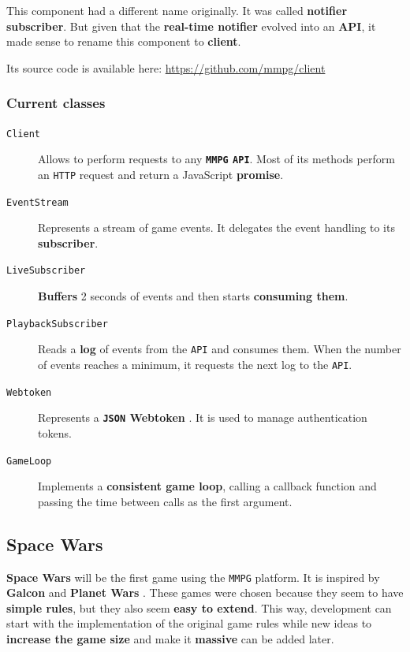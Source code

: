 \documentclass[a4paper,11pt]{article}
\begin{document}
This component had a different name originally. It was called \textbf{notifier subscriber}. But given that the \textbf{real-time
notifier} evolved into an \textbf{API}, it made sense to rename this component to \textbf{client}.

Its source code is available here: \url{https://github.com/mmpg/client}
\subsubsection{Current classes}
\begin{description}
\item[\texttt{Client}]
Allows to perform requests to any \textbf{\texttt{MMPG} \texttt{API}}. Most of its methods perform an \texttt{HTTP} request
  and return a JavaScript \textbf{promise}.
\item[\texttt{EventStream}]
Represents a stream of game events. It delegates the event handling to its \textbf{subscriber}.
\item[\texttt{LiveSubscriber}]
\textbf{Buffers} 2 seconds of events and then starts \textbf{consuming them}.
\item[\texttt{PlaybackSubscriber}]
Reads a \textbf{log} of events from the \texttt{API} and consumes them. When the number of
  events reaches a minimum, it requests the next log to the \texttt{API}.
\item[\texttt{Webtoken}]
Represents a \textbf{\texttt{JSON} Webtoken} \cite{jwt}. It is used to manage authentication tokens.
\item[\texttt{GameLoop}]
Implements a \textbf{consistent game loop}, calling a callback function and passing the time
  between calls as the first argument.
\end{description}
\subsection{Space Wars}
\textbf{Space Wars} will be the first game using the \texttt{MMPG} platform. It is inspired by \textbf{Galcon} \cite{galcon}
and \textbf{Planet Wars} \cite{planet_wars}. These games were chosen because they seem to have \textbf{simple rules}, but they
also seem \textbf{easy to extend}. This way, development can start with the implementation of the original game rules while
new ideas to \textbf{increase the game size} and make it \textbf{massive} can be added later.
\end{document}
